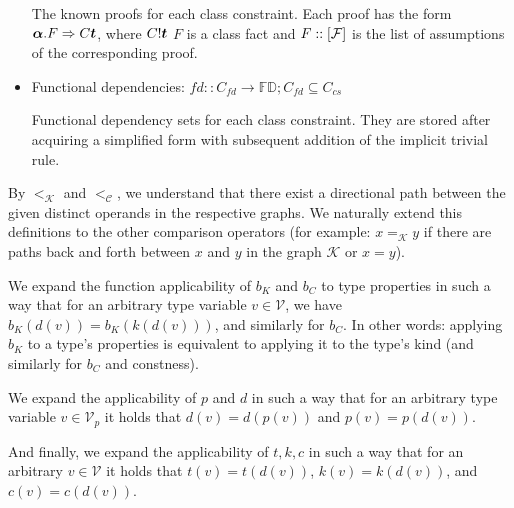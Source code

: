 \begin{defn}
\begin{itemize}
        The known proofs for each class constraint. Each proof has the form $\boldsymbol{\alpha} . F \Rightarrow C \boldsymbol{t}$, where $C! \boldsymbol{t}$ $F$ is a class fact and $F :: [\mathcal F]$ is the list of assumptions of the corresponding proof.
        \item Functional dependencies: $fd :: C_{fd} \to \mathbb{FD}; C_{fd} \subseteq C_{cs}$

        Functional dependency sets for each class constraint. They are stored after acquiring a simplified form with subsequent addition of the implicit trivial rule.
    \end{itemize}

    By $<_{\mathcal{K}}$ and $<_{\mathcal{C}}$,
    we understand that there exist a directional path between the given distinct operands in the respective graphs.
    We naturally extend this definitions to the other comparison operators
    (for example: $x =_{\mathcal{K}} y$ if there are paths back and forth between $x$ and $y$ in the graph $\mathcal{K}$ or $x = y$). %

\end{defn}

\begin{defn}
    We expand the function applicability of $b_K$ and $b_C$ to type properties in such a way that for an arbitrary type variable $v \in \mathcal{V}$, we have $b_K (d (v)) = b_K (k (d (v)))$, and similarly for $b_C$. In other words: applying $b_K$ to a type's properties is equivalent to applying it to the type's kind (and similarly for $b_C$ and constness).

    We expand the applicability of $p$ and $d$ in such a way that for an arbitrary type variable $v \in \mathcal{V}_p$ it holds that $d(v) = d(p(v))$ and $p(v) = p(d(v))$.

    And finally, we expand the applicability of $t, k, c$ in such a way that for an arbitrary $v \in \mathcal{V}$ it holds that $t (v) = t (d (v))$, $k (v) = k (d (v))$, and $c (v) = c (d (v))$.
\end{defn}

